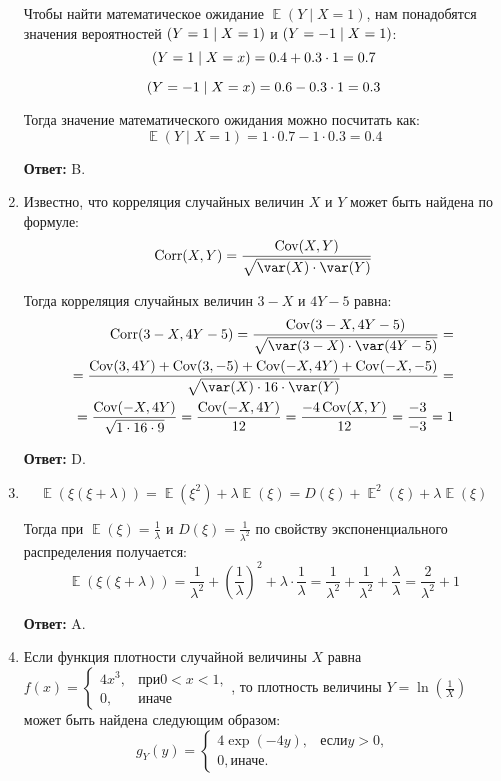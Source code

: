 \documentclass[a4paper]{article} %
\DeclareMathOperator{\cov}{Cov}
\DeclareMathOperator{\Corr}{Corr}
\DeclareMathOperator{\E}{\mathbb{E}}
\let\P\relax
\DeclareMathOperator{\P}{\mathbb{P}}
\begin{document}
\begin{enumerate}
    Чтобы найти математическое ожидание $\E(Y \mid X = 1)$, нам понадобятся значения вероятностей $\P(Y = 1 \mid X = 1)$ и $\P(Y = -1 \mid X = 1)$:
    \[
    \P(Y = 1 \mid X = x) = 0.4 + 0.3 \cdot 1 = 0.7
    \]
    
    \[
    \P(Y = -1 \mid X = x)  = 0.6 - 0.3 \cdot 1 = 0.3
    \]
    
    Тогда значение математического ожидания можно посчитать как:
    \[
    \E(Y \mid X = 1) = 1 \cdot 0.7 - 1 \cdot 0.3 = 0.4 
    \]
    
    \textbf{Ответ:} B.
    
    
    \item
    Известно, что корреляция случайных величин $X$ и $Y$ может быть найдена по формуле:
    \[
    \Corr(X, Y) = \frac{\cov(X, Y)}{\sqrt{\var(X) \cdot \var(Y)}}
    \]
    
    Тогда корреляция случайных величин $3 - X$ и $4Y - 5$ равна:
    \begin{align*}
    \Corr(3 - X, 4Y - 5) = \frac{\cov(3 - X, 4Y - 5)}{\sqrt{\var(3 - X) \cdot \var(4Y - 5)}} = \\
    = \frac{\cov(3, 4Y) + \cov(3, -5) + \cov(-X, 4Y) + \cov(-X, -5)}{\sqrt{\var(X) \cdot 16 \cdot \var(Y)}} = \\
    = \frac{\cov(-X, 4Y)}{\sqrt{1 \cdot 16 \cdot 9}} = \frac{\cov(-X, 4Y)}{12} = \frac{-4\cov(X, Y)}{12} = \frac{-3}{-3} = 1
    \end{align*}
    
    \textbf{Ответ:} D.
    
    
    \item
    
    \[
    \E(\xi(\xi + \lambda)) = \E(\xi^{2}) + \lambda\E(\xi) = D(\xi) + \E^{2}(\xi) + \lambda\E(\xi)
    \]
    
    Тогда при $\E(\xi) = \frac{1}{\lambda}$ и $D(\xi) = \frac{1}{\lambda^{2}}$ по свойству экспоненциального распределения получается:
    \[
    \E(\xi(\xi + \lambda)) = \frac{1}{\lambda^{2}} + \left( \frac{1}{\lambda} \right)^{2} + \lambda \cdot \frac{1}{\lambda} = \frac{1}{\lambda^{2}} + \frac{1}{\lambda^{2}} + \frac{\lambda}{\lambda} = \frac{2}{\lambda^{2}} + 1
    \]
    
    \textbf{Ответ:} A.
    
    
    \item
    
    Если функция плотности случайной величины $X$ равна
    $
    f(x) =
    \begin{cases}
    4x^{3}, & \text{при} 0 < x < 1, \\
    0, & \text{иначе}
    \end{cases}
    $,
    то плотность величины $Y = \ln(\frac{1}{X})$ может быть найдена следующим образом:
    \[
    g_{Y}(y) = 
    \begin{cases}
    4\exp(-4y), & \text{если} y > 0, \\
    0, \text{иначе}.
    \end{cases}
    \]
    

\end{enumerate}
\end{document}
